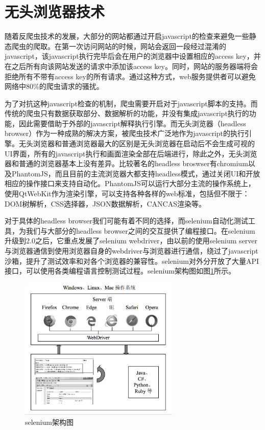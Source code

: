 \documentclass[doctor,privacy,twoside]{buaa_mac}
\begin{document}
\section{无头浏览器技术}
随着反爬虫技术的发展，大部分的网站都通过开启javascript的检查来避免一些静态爬虫的爬取。在第一次访问网站的时候，网站会返回一段经过混淆的javascript，该javascript执行完毕后会在用户的浏览器中设置相应的access key，并在之后所有向该网站发送的请求中添加该access key。同时，网站的服务器端将会拒绝所有不带有access key的所有请求。通过这种方式，web服务提供者可以避免网络中80\%的爬虫请求的骚扰。

为了对抗这种javascript检查的机制，爬虫需要开启对于javascript脚本的支持。而传统的爬虫只有数据获取部分、数据解析的功能，并没有集成javascript执行的功能，因此需要借助于外部的javascript解释执行引擎。而无头浏览器（headless browser）作为一种成熟的解决方案，被爬虫技术广泛地作为javascript的执行引擎。无头浏览器和普通浏览器最大的区别是无头浏览器在启动后不会生成可视的UI界面，所有的javascript执行和画面渲染全部在后端进行，除此之外，无头浏览器和普通的浏览器基本上没有差异。比较著名的headless broswser有chromium以及PhantomJS，而且目前的主流浏览器大都支持headless模式，通过关闭UI和开放相应的操作接口来支持自动化。PhantomJS可以运行大部分主流的操作系统上，使用QtWebKit作为渲染引擎，可以支持各种各样的web标准，包括但不限于：DOM树解析，CSS选择器，JSON数据解析，CANCAS渲染等。

对于具体的headless browser我们可能有着不同的选择，而selenium自动化测试工具，为我们与大部分的headless browser之间的交互提供了编程接口。在selenium升级到2.0之后，它重点发展了selenium webdriver，由以前的使用selenium server与浏览器通信到使用浏览器自身的webdriver与浏览器进行通信，绕过了javascript沙箱，提升了测试效率和对各个浏览器的兼容性。selenium对外分开放了大量API接口，可以使用各类编程语言控制测试过程。selenium架构图如图\ref{fig:selenium}所示。


\centerline{}
\begin{figure}[!h]
  \centering
  \includegraphics[width=0.68\textwidth]{images/selenium.png}
  \caption{selenium架构图}
  \label{fig:selenium}
\end{figure}
\end{document}
